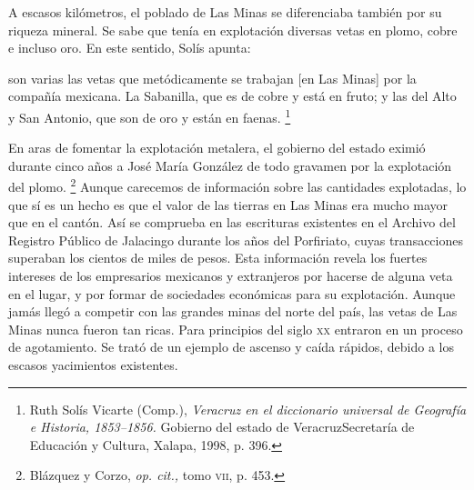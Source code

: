 \documentclass[14pt,twoside,final]{extbook} %
\let\oldfootnote\footnote
\renewcommand\footnote[1]{%
\oldfootnote{\hspace{1mm}#1}}
\begin{document}
A escasos kilómetros, el poblado de Las Minas se diferenciaba también por su riqueza mineral. Se sabe que tenía en explotación diversas vetas en plomo, cobre e incluso oro. En este sentido, Solís apunta:
\begin{quoting}
son varias las vetas que metódicamente se trabajan [en Las Minas] por la compañía mexicana. La Sabanilla, que es de cobre y está en fruto; y las del Alto y San Antonio, que son de oro y están en faenas.\footnote{Ruth Solís Vicarte (Comp.), \emph{Veracruz en el diccionario universal de Geografía e Historia, 1853--1856.} Gobierno del estado de Veracruz\kernedslash Secretaría de Educación y Cultura, Xalapa, 1998, p. 396.}
\end{quoting}
En aras de fomentar la explotación metalera, el gobierno del estado eximió durante cinco años a José María González de todo gravamen por la explotación del plomo.\footnote{Blázquez y Corzo, \emph{op. cit.,} tomo \textsc{vii}, p. 453.} Aunque carecemos de información sobre las cantidades explotadas, lo que sí es un hecho es que el valor de las tierras en Las Minas era mucho mayor que en el cantón. Así se comprueba en las escrituras existentes en el Archivo del Registro Público de Jalacingo durante los años del Porfiriato, cuyas transacciones superaban los cientos de miles de pesos. Esta información revela los fuertes intereses de los empresarios mexicanos y extranjeros por hacerse de alguna veta en el lugar, y por formar de sociedades económicas para su explotación. Aunque jamás llegó a competir con las grandes minas del norte del país, las vetas de Las Minas nunca fueron tan ricas. Para principios del siglo \textsc{xx} entraron en un proceso de agotamiento. Se trató de un ejemplo de ascenso y caída rápidos, debido a los escasos yacimientos existentes.
\end{document}
